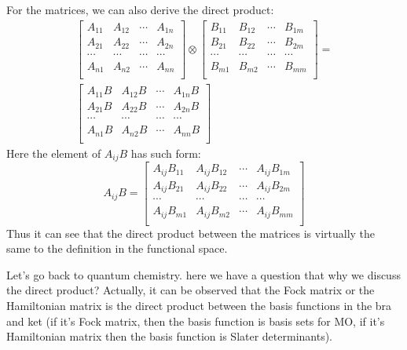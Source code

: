 For the matrices, we can also derive the direct product:
\begin{align}\label{}
  \begin{bmatrix}
    A_{11} & A_{12} & \cdots & A_{1n} \\
    A_{21} & A_{22} & \cdots & A_{2n} \\
    \cdots & \cdots & \cdots & \cdots \\
    A_{n1} & A_{n2} & \cdots & A_{nn} \\
  \end{bmatrix}
  \otimes
  \begin{bmatrix}
    B_{11} & B_{12} & \cdots & B_{1m} \\
    B_{21} & B_{22} & \cdots & B_{2m} \\
    \cdots & \cdots & \cdots & \cdots \\
    B_{m1} & B_{m2} & \cdots & B_{mm} \\
  \end{bmatrix} = \nonumber \\
  \begin{bmatrix}
    A_{11}B & A_{12}B & \cdots & A_{1n}B \\
    A_{21}B & A_{22}B & \cdots & A_{2n}B \\
    \cdots & \cdots   & \cdots & \cdots  \\
    A_{n1}B & A_{n2}B & \cdots & A_{nn}B \\
  \end{bmatrix}
\end{align}
Here the element of $A_{ij}B$ has such form:
\begin{equation}\label{}
  A_{ij}B =
  \begin{bmatrix}
    A_{ij}B_{11} & A_{ij}B_{12} & \cdots & A_{ij}B_{1m} \\
    A_{ij}B_{21} & A_{ij}B_{22} & \cdots & A_{ij}B_{2m} \\
    \cdots &       \cdots & \cdots &       \cdots \\
    A_{ij}B_{m1} & A_{ij}B_{m2} & \cdots & A_{ij}B_{mm} \\
  \end{bmatrix}
\end{equation}
Thus it can see that the direct product between the matrices is
virtually the same to the definition in the functional space.

Let's go back to quantum chemistry. here we have a question that why we
discuss the direct product? Actually, it can be observed that the Fock matrix or
the Hamiltonian matrix is the direct product between the basis functions in
the bra and ket (if it's Fock matrix, then the basis function is basis sets for
MO, if it's Hamiltonian matrix then the basis function is Slater determinants).

